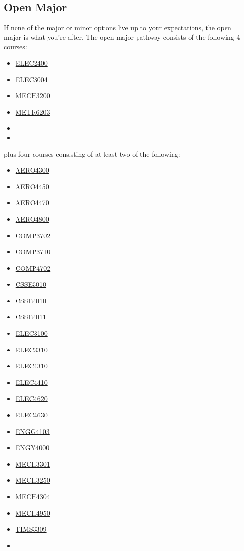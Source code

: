 \documentclass[a4paper,12pt]{report}
\begin{document}
\subsection{Open Major}
If none of the major or minor options live up to your expectations, the open major is what you're after. The open major pathway consists of the following 4 courses:
\begin{multicols}{3}
    \begin{itemize}
        \item \hyperlink{ELEC2400}{ELEC2400}
        \item \hyperlink{ELEC3004}{ELEC3004}
        \item \hyperlink{MECH3200}{MECH3200}
        \item \hyperlink{METR6203}{METR6203}
        \item[]
        \item[]
    \end{itemize}
\end{multicols}
plus four courses consisting of at least two of the following:
\begin{multicols}{3}
    \begin{itemize}
        \item \hyperlink{AERO4300}{AERO4300}
        \item \hyperlink{AERO4450}{AERO4450}
        \item \hyperlink{AERO4470}{AERO4470}
        \item \hyperlink{AERO4800}{AERO4800}
        \item \hyperlink{COMP3702}{COMP3702}
        \item \hyperlink{COMP3710}{COMP3710}
        \item \hyperlink{COMP4702}{COMP4702}
        \item \hyperlink{CSSE3010}{CSSE3010}
        \item \hyperlink{CSSE4010}{CSSE4010}
        \item \hyperlink{CSSE4011}{CSSE4011}
        \item \hyperlink{ELEC3100}{ELEC3100}
        \item \hyperlink{ELEC3310}{ELEC3310}
        \item \hyperlink{ELEC4310}{ELEC4310}
        \item \hyperlink{ELEC4410}{ELEC4410}
        \item \hyperlink{ELEC4620}{ELEC4620}
        \item \hyperlink{ELEC4630}{ELEC4630}
        \item \hyperlink{ENGG4103}{ENGG4103}
        \item \hyperlink{ENGY4000}{ENGY4000}
        \item \hyperlink{MECH3301}{MECH3301}
        \item \hyperlink{MECH3250}{MECH3250}
        \item \hyperlink{MECH4304}{MECH4304}
        \item \hyperlink{MECH4950}{MECH4950}
        \item \hyperlink{TIMS3309}{TIMS3309}
        \item[]
    \end{itemize}
\end{multicols}
\end{document}
